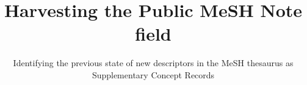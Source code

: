 %
%
%
%
%
\RequirePackage{fix-cm}
%
\documentclass[twocolumn]{svjour3}          %
%
\smartqed  %
%
\usepackage{graphicx}
\setlength {\marginparwidth }{2cm}
\usepackage[colorinlistoftodos]{todonotes}
\usepackage{multirow}
\usepackage{hyperref}
\usepackage{array}
\usepackage{tabu}
\usepackage{tabularx}
\newcolumntype{M}[1]{>{\centering\arraybackslash}m{#1}}
\newcolumntype{R}[1]{>{\raggedleft\arraybackslash}m{#1}}
\newcolumntype{L}[1]{>{\arraybackslash}m{#1}}

%
%
%
%
%

\sloppy

\title{Harvesting the Public MeSH Note field
}
\subtitle{Identifying the previous state of new descriptors in the MeSH thesaurus as Supplementary Concept Records
}

